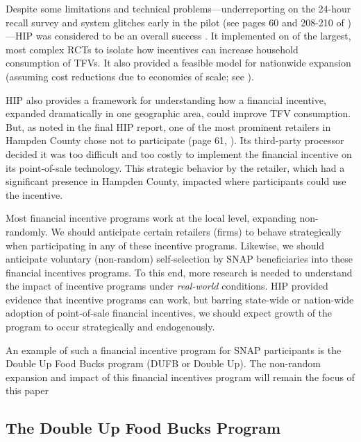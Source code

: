 \documentclass[12pt,letterpaperpaper,]{book}
\begin{document}
Despite some limitations and technical problems---underreporting on the
24-hour recall survey and system glitches early in the pilot (see pages
60 and 208-210 of \citet{bartlett_evaluation_2014})---HIP was considered
to be an overall success
\citep{klerman_short-run_2014, olsho_financial_2016}. It implemented on
of the largest, most complex RCTs to isolate how incentives can increase
household consumption of TFVs. It also provided a feasible model for
nationwide expansion (assuming cost reductions due to economies of
scale; see \citet{an_nationwide_2015}).

HIP also provides a framework for understanding how a financial
incentive, expanded dramatically in one geographic area, could improve
TFV consumption. But, as noted in the final HIP report, one of the most
prominent retailers in Hampden County chose not to participate (page 61,
\citet{bartlett_evaluation_2014}). Its third-party processor decided it
was too difficult and too costly to implement the financial incentive on
its point-of-sale technology. This strategic behavior by the retailer,
which had a significant presence in Hampden County, impacted where
participants could use the incentive.

Most financial incentive programs work at the local level, expanding
non-randomly. We should anticipate certain retailers (firms) to behave
strategically when participating in any of these incentive programs.
Likewise, we should anticipate voluntary (non-random) self-selection by
SNAP beneficiaries into these financial incentives programs. To this
end, more research is needed to understand the impact of incentive
programs under \emph{real-world} conditions. HIP provided evidence that
incentive programs can work, but barring state-wide or nation-wide
adoption of point-of-sale financial incentives, we should expect growth
of the program to occur strategically and endogenously.

An example of such a financial incentive program for SNAP participants
is the Double Up Food Bucks program (DUFB or Double Up). The non-random
expansion and impact of this financial incentives program will remain
the focus of this paper

\subsection*{The Double Up Food Bucks
Program}\label{the-double-up-food-bucks-program}
\end{document}

